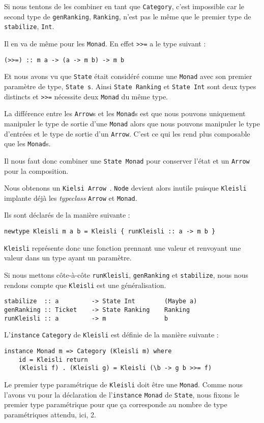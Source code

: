 \documentclass{llncs}
\newcommand{\Arr}{\lstinline{Arrow} }
\newcommand{\Arrp}{\lstinline{Arrow}. }
\newcommand{\Arrs}{\lstinline{Arrow}s }
\begin{document}
Si nous tentons de les combiner en tant que \lstinline{Category}, c'est impossible
car le second type de \lstinline{genRanking}, \lstinline{Ranking}, n'est pas le
même que le premier type de \lstinline{stabilize}, \lstinline{Int}.

Il en va de même pour les \lstinline{Monad}.
En effet \lstinline{>>=} a le type suivant :
\begin{lstlisting}
(>>=) :: m a -> (a -> m b) -> m b
\end{lstlisting}

Et nous avons vu que \lstinline{State} était considéré comme une \lstinline{Monad}
avec son premier paramètre de type, \lstinline{State s}.
Ainsi \lstinline{State Ranking} et \lstinline{State Int} sont deux types distincts
et \lstinline{>>=} nécessite deux \lstinline{Monad} du même type.

La différence entre les \Arrs et les \lstinline{Monad}s est que nous pouvons
uniquement manipuler le type de sortie d'une \lstinline{Monad} alors que nous pouvons
manipuler le type d'entrées et le type de sortie d'un \Arrp
C'est ce qui les rend plus composable que les \lstinline{Monad}s.

Il nous faut donc combiner une \lstinline{State Monad} pour conserver l'état et un
\lstinline{Arrow} pour la composition.

Nous obtenons un \lstinline{Kielsi Arrow}~\cite{Hughes00}.
\lstinline{Node} devient alors inutile puisque \lstinline{Kleisli} implante déjà les
\emph{typeclass} \Arr et \lstinline{Monad}.

Ils sont déclarés de la manière suivante :
\begin{lstlisting}
newtype Kleisli m a b = Kleisli { runKleisli :: a -> m b }
\end{lstlisting}

\lstinline{Kleisli} représente donc une fonction prennant une valeur et renvoyant
une valeur dans un type ayant un paramètre.

Si nous mettons côte-à-côte \lstinline{runKleisli}, \lstinline{genRanking} et
\lstinline{stabilize}, nous nous rendons compte que \lstinline{Kleisli} est une
généralisation.
\begin{lstlisting}
stabilize  :: a         -> State Int        (Maybe a)
genRanking :: Ticket    -> State Ranking    Ranking
runKleisli :: a         -> m                b
\end{lstlisting}

L'\lstinline{instance} \lstinline{Category} de \lstinline{Kleisli} est
définie de la manière suivante :
\begin{lstlisting}
instance Monad m => Category (Kleisli m) where
    id = Kleisli return
    (Kleisli f) . (Kleisli g) = Kleisli (\b -> g b >>= f)
\end{lstlisting}
Le premier type paramétrique de \lstinline{Kleisli} doit être une \lstinline{Monad}.
Comme nous l'avons vu pour la déclaration de l'\lstinline{instance} \lstinline{Monad}
de \lstinline{State}, nous fixons le premier type paramétrique pour que ça corresponde
au nombre de type paramétriques attendu, ici, 2.
\end{document}
